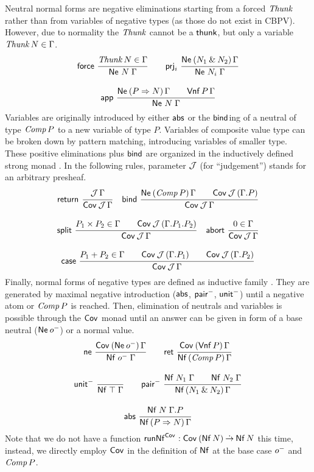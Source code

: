 \documentclass[sigplan,screen,fleqn,review]{acmart} %
\begin{document}
Neutral normal forms  are negative eliminations
starting from a forced $\tThunk$ rather than from variables of negative
types (as those do not exist in CBPV).  However, due to normality
the $\tThunk$ cannot be a $\tthunk$, but only a variable
$\Thunk N \in \Gamma$.
\begin{gather*}
  \nru{\tforce}{\Thunk N \in \Gamma}{\Ne N \Gamma}
\qquad
  \nru{\tprj_i}
      {\NeP {N_1 \ntimes N_2} \Gamma}
      {\Ne {N_i} \Gamma}
\\[2ex]
  \nru{\tapp}
      {\NeP {P \To N} \Gamma \qquad \PValNf P \Gamma}
      {\Ne N \Gamma}
\end{gather*}
Variables are originally introduced by either $\tabs$ or
the $\tbind$\-ing of a neutral of type $\Comp P$ to a new variable of type
$P$.  Variables of composite value type can be broken down by pattern
matching, introducing variables of smaller type.  These positive
eliminations plus $\tbind$ are organized in the
inductively defined strong monad \fbox{$\Cov$}.
In the following rules, parameter $\J$ (for ``judgement'') stands for an
arbitrary presheaf.
\begin{gather*}
  \nru{\treturn}{\J\,\Gamma}{\Cover \J \Gamma}
\quad
  \nru{\tbind}
      {\NeP {\Comp P} \Gamma \qquad \Cover \J (\cext \Gamma P)}
      {\Cover \J \Gamma}
\\[2ex]
  \nru{\tsplit}
      {P_1 \times P_2 \in \Gamma \qquad
       \Cover \J (\cext {\cext \Gamma {P_1}} {P_2})
      }
      {\Cover \J \Gamma}
\quad
  \nru{\tabort}
      {\tyempty \in \Gamma}
      {\Cover \J \Gamma}
\\[2ex]
  \nru{\tcase}
      {P_1 + P_2 \in \Gamma
       \qquad \Cover \J (\cext \Gamma {P_1})
       \qquad \Cover \J (\cext \Gamma {P_2})
      }
      {\Cover \J \Gamma}
\end{gather*}
Finally, normal forms of negative types are defined as inductive
family .  They are generated by maximal negative
introduction ($\tabs$, $\npair$, $\nunit$) until a negative atom or
$\Comp P$ is reached.  Then, elimination of neutrals and variables is
possible through the $\Cov$ monad until an answer can be given in form
of a base neutral ($\tNe\,\natom$) or a normal value.
\begin{gather*}
  \nru{\tne}
      {\CoverP {\tNe\,\natom} \Gamma}
      {\Nf {\natom} \Gamma}
\qquad
  \nru{\tret}
      {\CoverP {\tVNf\,P}  \Gamma}
      {\NfP {\Comp P} \Gamma}
\\[2ex]
  \nru{\nunit}{}{\Nf \top \Gamma}
\qquad
  \nru{\npair}
      {\Nf {N_1} \Gamma \qquad \Nf {N_2} \Gamma}
      {\NfP {N_1 \ntimes N_2} \Gamma}
\\[2ex]
  \nru{\tabs}
      {\Nf N {\cext \Gamma P}}
      {\NfP {P \To N} \Gamma}
\end{gather*}
Note that we do not have a function
$\trunNf[\Cov] : \Cov\,(\tNf\,N) \todot \tNf\,N$ this time, instead, we
directly employ $\Cov$ in the definition of $\tNf$ at the base case
$\natom$ and $\Comp P$.
\end{document}
